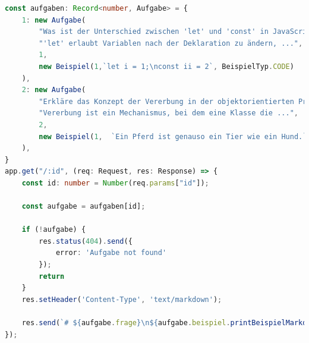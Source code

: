 \documentclass[./einleitung.tex]{subfiles}
\begin{document}
    \begin{lstlisting}[language=Typescript, caption=Neuer Endpunkt in index.ts, label=indexTs]
const aufgaben: Record<number, Aufgabe> = {
    1: new Aufgabe(
        "Was ist der Unterschied zwischen 'let' und 'const' in JavaScript?",
        "'let' erlaubt Variablen nach der Deklaration zu ändern, ...",
        1,
        new Beispiel(1,`let i = 1;\nconst ii = 2`, BeispielTyp.CODE)
    ),
    2: new Aufgabe(
        "Erkläre das Konzept der Vererbung in der objektorientierten Programmierung.",
        "Vererbung ist ein Mechanismus, bei dem eine Klasse die ...",
        2,
        new Beispiel(1,  `Ein Pferd ist genauso ein Tier wie ein Hund.`, BeispielTyp.TEXT)
    ),
}
app.get("/:id", (req: Request, res: Response) => {
    const id: number = Number(req.params["id"]);

    const aufgabe = aufgaben[id];

    if (!aufgabe) {
        res.status(404).send({
            error: 'Aufgabe not found'
        });
        return
    }
    res.setHeader('Content-Type', 'text/markdown');

    res.send(`# ${aufgabe.frage}\n${aufgabe.beispiel.printBeispielMarkdown()}`);
});
    \end{lstlisting}
\end{document}
